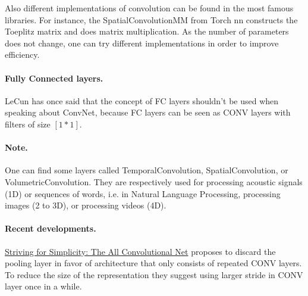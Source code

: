 Also different implementations  of convolution can be found in the most famous libraries. For instance, the SpatialConvolutionMM from Torch nn constructs the Toeplitz matrix and does matrix multiplication. As the number of parameters does not change, one can try different implementations in order to improve efficiency.

\paragraph{Fully Connected layers. }

LeCun has once said that the concept of FC layers shouldn't be used when speaking about ConvNet, because FC layers can be seen as CONV layers with filters of size $[1*1]$.

\paragraph{Note. }

One can find some layers called TemporalConvolution, SpatialConvolution, or VolumetricConvolution. They are respectively used for processing acoustic signals (1D) or sequences of words, i.e. in Natural Language Processing, processing images (2 to 3D), or processing videos (4D).

\paragraph{Recent developments. }

\href{http://arxiv.org/abs/1412.6806}{Striving for Simplicity: The All Convolutional Net} proposes to discard the pooling layer in favor of architecture that only consists of repeated CONV layers. To reduce the size of the representation they suggest using larger stride in CONV layer once in a while.


